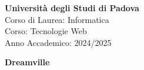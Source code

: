 \begin{minipage}{0.3\textwidth}
    \centering
\end{minipage}
\hfill
\begin{minipage}{0.3\textwidth}
    \centering
\end{minipage}

\bigskip

\begin{center}
    \textbf{Università degli Studi di Padova} \\
    Corso di Laurea: Informatica \\
    Corso: Tecnologie Web \\
    Anno Accademico: 2024/2025
\end{center}

\bigskip
\bigskip
\bigskip

\begin{center}
  \Huge\textbf{Dreamville}
\end{center}
